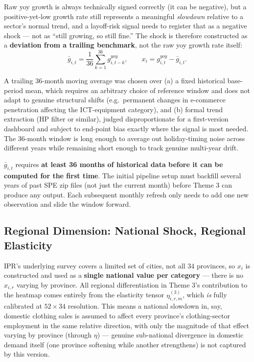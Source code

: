 \documentclass[11pt]{article}
\begin{document}
Raw yoy growth is always technically signed correctly (it can be negative),
but a positive-yet-low growth rate still represents a meaningful
\emph{slowdown} relative to a sector's normal trend, and a layoff-risk
signal needs to register that as a negative shock --- not as ``still
growing, so still fine.'' The shock is therefore constructed as a
\textbf{deviation from a trailing benchmark}, not the raw yoy growth rate
itself:
\begin{equation}
  \bar g_{i,t} = \frac{1}{36}\sum_{k=1}^{36} g_{i,t-k}^{yoy},
  \qquad
  x_i = g_{i,t}^{yoy} - \bar g_{i,t}.
  \label{eq:theme3-shock}
\end{equation}

\begin{decisionbox}
A trailing 36-month moving average was chosen over (a) a fixed historical
base-period mean, which requires an arbitrary choice of reference window and
does not adapt to genuine structural shifts (e.g.\ permanent changes in
e-commerce penetration affecting the ICT-equipment category), and (b) formal
trend extraction (HP filter or similar), judged disproportionate for a
first-version dashboard and subject to end-point bias exactly where the
signal is most needed. The 36-month window is long enough to average out
holiday-timing noise across different years while remaining short enough to
track genuine multi-year drift.
\end{decisionbox}

\begin{warningbox}
$\bar g_{i,t}$ requires \textbf{at least 36 months of historical data before
it can be computed for the first time}. The initial pipeline setup must
backfill several years of past SPE zip files (not just the current month)
before Theme 3 can produce any output. Each subsequent monthly refresh only
needs to add one new observation and slide the window forward.
\end{warningbox}

\subsection{Regional Dimension: National Shock, Regional Elasticity}
\label{sec:theme3-regional}

IPR's underlying survey covers a limited set of cities, not all 34
provinces, so $x_i$ is constructed and used as a \textbf{single national
value per category} --- there is no $x_{i,r}$ varying by province. All
regional differentiation in Theme 3's contribution to the heatmap comes
entirely from the elasticity tensor $\eta^{(3)}_{i,r,m}$, which \emph{is}
fully calibrated at $52\times34$ resolution. This means a national
slowdown in, say, domestic clothing sales is assumed to affect every
province's clothing-sector employment in the same relative direction, with
only the magnitude of that effect varying by province (through $\eta$) ---
genuine sub-national divergence in domestic demand itself (one province
softening while another strengthens) is not captured by this version.
\end{document}
